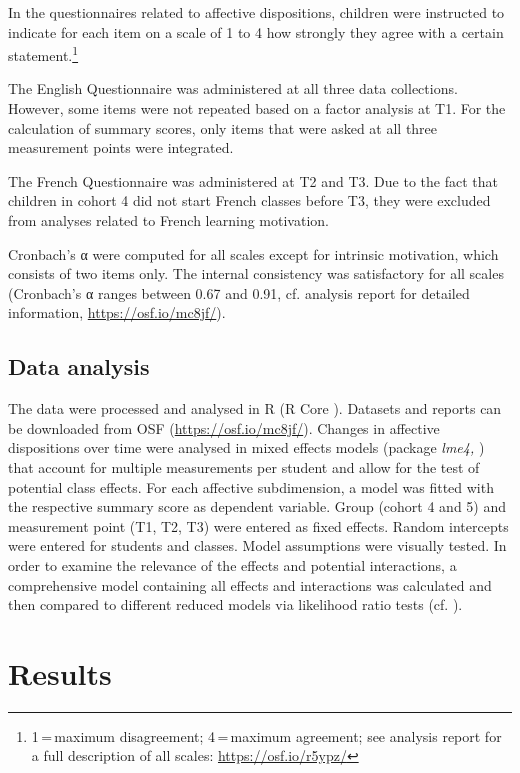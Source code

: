 \documentclass[output=paper]{langsci/langscibook}
\begin{document}
In the questionnaires related to affective dispositions, children were instructed to indicate for each item on a scale of 1 to 4 how strongly they agree with a certain statement.\footnote{1\,=\,maximum disagreement; 4\,=\,maximum agreement; see analysis report for a full description of all scales: \url{https://osf.io/r5ypz/}}

The English Questionnaire was administered at all three data collections. However, some items were not repeated based on a factor analysis at T1. For the calculation of summary scores, only items that were asked at all three measurement points were integrated. 

The French Questionnaire was administered at T2 and T3. Due to the fact that children in cohort 4 did not start French classes before T3, they were excluded from analyses related to French learning motivation.

Cronbach’s α were computed for all scales except for intrinsic motivation, which consists of two items only. The internal consistency was satisfactory for all scales (Cronbach’s α ranges between 0.67 and 0.91, cf. analysis report for detailed information, \url{https://osf.io/mc8jf/}).

\subsection{Data analysis}

The data were processed and analysed in R (R Core \citealt{Team2019}). Datasets and reports can be downloaded from OSF (\url{https://osf.io/mc8jf/}). Changes in affective dispositions over time were analysed in mixed effects models (package \textit{lme4,} \citealt{BatesEtAl2015}) that account for multiple measurements per student and allow for the test of potential class effects. For each affective subdimension, a model was fitted with the respective summary score as dependent variable. Group (cohort 4 and 5) and measurement point (T1, T2, T3) were entered as fixed effects. Random intercepts were entered for students and classes. Model assumptions were visually tested. In order to examine the relevance of the effects and potential interactions, a comprehensive model containing all effects and interactions was calculated and then compared to different reduced models via likelihood ratio tests (cf. \citealt{Winter2013}). 

\section{Results}
\end{document}
